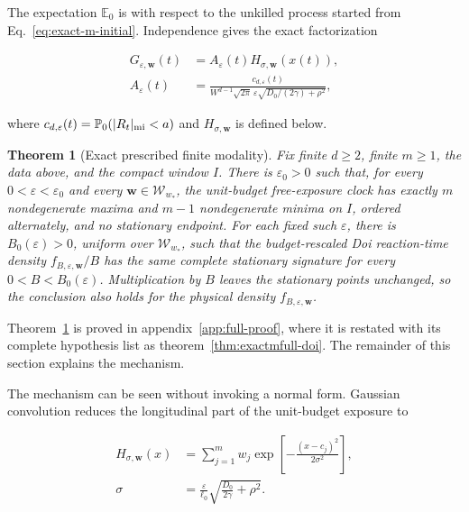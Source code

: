 \documentclass{iopjournal}
\theoremstyle{plain}
\newtheorem{theorem}{Theorem}
\theoremstyle{definition}
\begin{document}
The expectation $\mathbb E_0$ is with respect to the unkilled process started
from Eq.~\eqref{eq:exact-m-initial}.  Independence gives the exact
factorization

\begin{align}
 G_{\varepsilon,\bm w}(t)
 &=A_\varepsilon(t)H_{\sigma,\bm w}(x(t)),\nonumber\\
 A_\varepsilon(t)
 &=\frac{c_{d,\varepsilon}(t)}
 {W^{d-1}\sqrt{2\pi}\,\varepsilon
  \sqrt{D_0/(2\gamma)+\rho^2}},
 \label{eq:exact-m-factorization}
\end{align}

where $c_{d,\varepsilon}(t)=
\mathbb P_0(|R_t|_{\rm mi}<a)$ and $H_{\sigma,\bm w}$ is defined below.

\begin{theorem}[Exact prescribed finite modality]
\label{thm:main-modality}
Fix finite $d\ge2$, finite $m\ge1$, the data above, and the compact window
$I$.  There is $\varepsilon_0>0$ such that, for every
$0<\varepsilon<\varepsilon_0$ and every
$\bm w\in\mathcal W_{w_*}$, the unit-budget free-exposure clock has exactly
$m$ nondegenerate maxima and $m-1$ nondegenerate minima on $I$, ordered
alternately, and no stationary endpoint.  For each fixed such
$\varepsilon$, there is $B_0(\varepsilon)>0$, uniform over
$\mathcal W_{w_*}$, such that the budget-rescaled Doi reaction-time density
$f_{B,\varepsilon,\bm w}/B$ has the same complete stationary signature for
every $0<B<B_0(\varepsilon)$.  Multiplication by $B$ leaves the stationary
points unchanged, so the conclusion also holds for the physical density
$f_{B,\varepsilon,\bm w}$.
\end{theorem}

\noindent
Theorem~\ref{thm:main-modality} is proved in
appendix~\ref{app:full-proof}, where it is restated with its complete
hypothesis list as theorem~\ref{thm:exactmfull-doi}.  The remainder of this
section explains the mechanism.

The mechanism can be seen without invoking a normal form.  Gaussian
convolution reduces the longitudinal part of the unit-budget exposure to

\begin{equation}
 \begin{aligned}
  H_{\sigma,\bm w}(x)
  &=\sum_{j=1}^{m}w_j
    \exp\!\left[-\frac{(x-c_j)^2}{2\sigma^2}\right],\\
  \sigma&=\frac{\varepsilon}{\ell_0}
  \sqrt{\frac{D_0}{2\gamma}+\rho^2}.
 \end{aligned}
 \label{eq:exact-m-mixture}
\end{equation}
\end{document}
